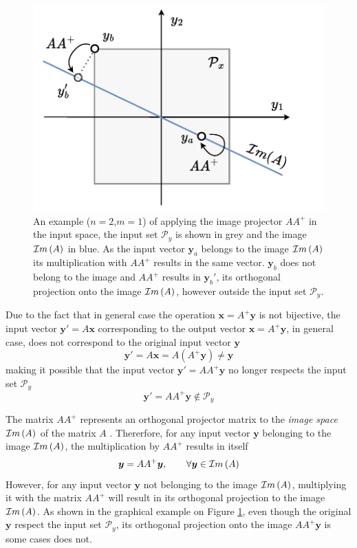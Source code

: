 \begin{figure}
    \centering
    \includegraphics[width=\linewidth]{Chapters/imgs/img_pseudo_prob.pdf}
    \caption{An example ($n=2$,$m=1$) of applying the image projector $AA^+$ in the input space, the input set $\mathcal{P}_y$ is shown in grey and the image $\mathcal{I}m\left(A\right)$ in blue. As the input vector $\bm{y}_a$ belongs to the image $\mathcal{I}m\left(A\right)$ its multiplication with $AA^+$ results in the same vector. $\bm{y}_b$  does not belong to the image and $AA^+$ results in $\bm{y}_b'$, its orthogonal projection onto the image $\mathcal{I}m\left(A\right)$, however outside the input set $\mathcal{P}_y$.}
    \label{fig:image_psueodinverse_ilustration}
\end{figure}
Due to the fact that in general case the operation $\bm{x}=A^+\bm{y}$ is not bijective, the input vector $\bm{y}'=A\bm{x}$ corresponding to the output vector $\bm{x}=A^+\bm{y}$, in general case, does not correspond to the original input vector $\bm{y}$ 
\begin{equation}
\bm{y}' = A\bm{x} = A(A^+\bm{y})\neq\bm{y}
\end{equation}
making it possible that the input vector $\bm{y}'=AA^+\bm{y}$ no longer respects the input set $\mathcal{P}_y$
\begin{equation}
    \bm{y}'=AA^+\bm{y}\notin\mathcal{P}_y
\end{equation}

The matrix $AA^+$ represents an orthogonal projector matrix to the \textit{image space} $\mathcal{I}m\left(A\right)$ of the matrix $A$ \cite[Chapter 5.5.4]{golub1996matrix}. Thererfore, for any input vector $\bm{y}$ belonging to the image $\mathcal{I}m\left(A\right)$, the multiplication by $AA^+$ results in itself \cite[Chapeter 1.3.1]{wang2018generalized}
\begin{equation}
    \bm{y} = AA^+\bm{y}, \qquad \forall \bm{y}\in\mathcal{I}m\left(A\right)
\end{equation}
However, for any input vector $\bm{y}$ not belonging to the image $\mathcal{I}m\left(A\right)$, multiplying it with the matrix $AA^+$ will result in its orthogonal projection to the image $\mathcal{I}m\left(A\right)$. As shown in the graphical example on Figure \ref{fig:image_psueodinverse_ilustration}, even though the original $\bm{y}$ respect the input set $\mathcal{P}_y$, its orthogonal projection onto the image $AA^+\bm{y}$ is some cases does not.

